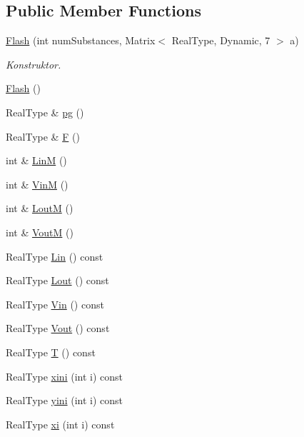 \subsection*{Public Member Functions}
\begin{DoxyCompactItemize}
\item 
\mbox{\hyperlink{class_flash_abd6d1b3833826823dceb861c1da31b71}{Flash}} (int num\+Substances, Matrix$<$ Real\+Type, Dynamic, 7 $>$ a)
\begin{DoxyCompactList}\small\item\em Konstruktor. \end{DoxyCompactList}\item 
\mbox{\hyperlink{class_flash_ac655ea4d40f71a0a6ecb9adfeeb2017e}{Flash}} ()
\item 
Real\+Type \& \mbox{\hyperlink{class_flash_a7e75d64415f5fd5dcb16fb0b8e5d4f40}{pg}} ()
\item 
Real\+Type \& \mbox{\hyperlink{class_flash_a561213a694ff2d2fd93b4a7c79401611}{F}} ()
\item 
int \& \mbox{\hyperlink{class_flash_a34db5184e457483f86b89cb89e393dc5}{LinM}} ()
\item 
int \& \mbox{\hyperlink{class_flash_a16c48c278f54a6de62dd8c1241e9670a}{VinM}} ()
\item 
int \& \mbox{\hyperlink{class_flash_af0ad1baa628d2d891c036cefe7fb8a48}{LoutM}} ()
\item 
int \& \mbox{\hyperlink{class_flash_adba4e13cb3bbf4f3c2e9fbef7f4e13c1}{VoutM}} ()
\item 
Real\+Type \mbox{\hyperlink{class_flash_a074095aaca2230d0bc8d9e5cc513086c}{Lin}} () const
\item 
Real\+Type \mbox{\hyperlink{class_flash_a1c6d0596f0a6dbdd7b391ab85772b2d4}{Lout}} () const
\item 
Real\+Type \mbox{\hyperlink{class_flash_a6b1604cf88d584aeea83f00bc7587dda}{Vin}} () const
\item 
Real\+Type \mbox{\hyperlink{class_flash_aadd1e6c91da7d8a56b69f815b4346c5b}{Vout}} () const
\item 
Real\+Type \mbox{\hyperlink{class_flash_aacc8bbe06bf30d2e124bbc6eadb31507}{T}} () const
\item 
Real\+Type \mbox{\hyperlink{class_flash_a64985fac64164cce252b68801b269f78}{xini}} (int i) const
\item 
Real\+Type \mbox{\hyperlink{class_flash_a7667f4e5e1df4abe07bf12b4e7696a81}{yini}} (int i) const
\item 
Real\+Type \mbox{\hyperlink{class_flash_abf2fb32491f3e75427ad25dadd7af546}{xi}} (int i) const

\end{DoxyCompactItemize}
